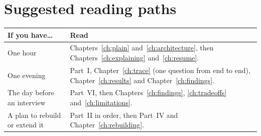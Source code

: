 \section*{Suggested reading paths}

\begin{center}
\begin{tabularx}{\textwidth}{@{}p{4.2cm}L@{}}
\toprule
\textbf{If you have\ldots} & \textbf{Read}\\
\midrule
One hour & Chapters~\ref{ch:plain} and~\ref{ch:architecture}, then Chapters~\ref{ch:explaining} and~\ref{ch:resume}.\\
One evening & Part~I, Chapter~\ref{ch:trace} (one question from end to end), Chapter~\ref{ch:results} and Chapter~\ref{ch:findings}.\\
The day before an interview & Part~VI, then Chapters~\ref{ch:findings}, \ref{ch:tradeoffs} and~\ref{ch:limitations}.\\
A plan to rebuild or extend it & Part~II in order, then Part~IV and Chapter~\ref{ch:rebuilding}.\\
\bottomrule
\end{tabularx}
\end{center}
